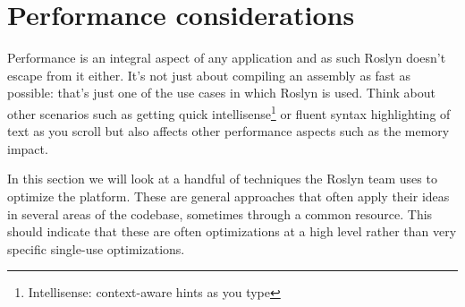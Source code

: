 \section{Performance considerations}
\label{sec:performance}

Performance is an integral aspect of any application and as such Roslyn doesn't escape from it either. It's not just about compiling an assembly as fast as possible: that's just one of the use cases in which Roslyn is used. Think about other scenarios such as getting quick \gls{intellisense}\footnote{Intellisense: context-aware hints as you type} or fluent syntax highlighting of text as you scroll but also affects other performance aspects such as the memory impact.

In this section we will look at a handful of techniques the Roslyn team uses to optimize the platform. These are general approaches that often apply their ideas in several areas of the codebase, sometimes through a common resource. This should indicate that these are often optimizations at a high level rather than very specific single-use optimizations. 










